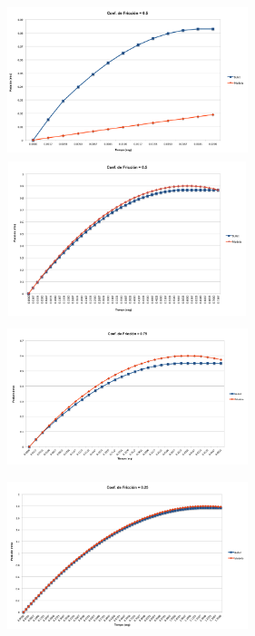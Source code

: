 \documentclass{article}
\begin{document}
\begin{itemize}
\includegraphics[width=7cm, height=4.5cm]{image006.png}
\includegraphics[width=7cm, height=4.5cm]{image007.png}
\includegraphics[width=7cm, height=4.5cm]{image008.png}
\includegraphics[width=7cm, height=4.5cm]{image009.png}


\end{itemize}
\end{document}
